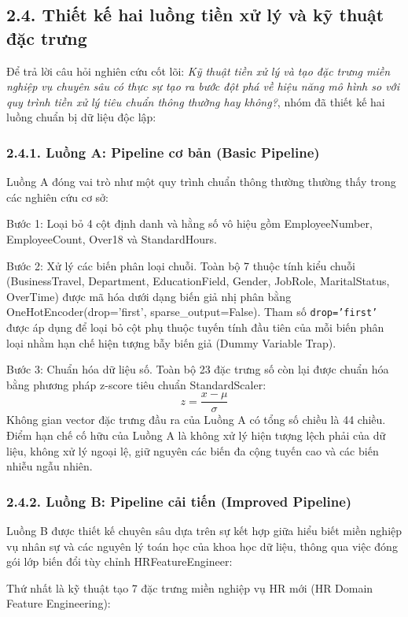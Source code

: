 \documentclass[12pt,a4paper]{article}
\begin{document}
\subsection{2.4. Thiết kế hai luồng tiền xử lý và kỹ thuật đặc trưng}
Để trả lời câu hỏi nghiên cứu cốt lõi: \textit{Kỹ thuật tiền xử lý và tạo đặc trưng miền nghiệp vụ chuyên sâu có thực sự tạo ra bước đột phá về hiệu năng mô hình so với quy trình tiền xử lý tiêu chuẩn thông thường hay không?}, nhóm đã thiết kế hai luồng chuẩn bị dữ liệu độc lập:

\subsubsection{2.4.1. Luồng A: Pipeline cơ bản (Basic Pipeline)}
Luồng A đóng vai trò như một quy trình chuẩn thông thường thường thấy trong các nghiên cứu cơ sở:

Bước 1: Loại bỏ 4 cột định danh và hằng số vô hiệu gồm EmployeeNumber, EmployeeCount, Over18 và StandardHours.

Bước 2: Xử lý các biến phân loại chuỗi. Toàn bộ 7 thuộc tính kiểu chuỗi (BusinessTravel, Department, EducationField, Gender, JobRole, MaritalStatus, OverTime) được mã hóa dưới dạng biến giả nhị phân bằng OneHotEncoder(drop='first', sparse\_output=False). Tham số \texttt{drop='first'} được áp dụng để loại bỏ cột phụ thuộc tuyến tính đầu tiên của mỗi biến phân loại nhằm hạn chế hiện tượng bẫy biến giả (Dummy Variable Trap).

Bước 3: Chuẩn hóa dữ liệu số. Toàn bộ 23 đặc trưng số còn lại được chuẩn hóa bằng phương pháp z-score tiêu chuẩn StandardScaler:
\begin{equation}
z = \frac{x - \mu}{\sigma}
\end{equation}
Không gian vector đặc trưng đầu ra của Luồng A có tổng số chiều là 44 chiều. Điểm hạn chế cố hữu của Luồng A là không xử lý hiện tượng lệch phải của dữ liệu, không xử lý ngoại lệ, giữ nguyên các biến đa cộng tuyến cao và các biến nhiễu ngẫu nhiên.

\subsubsection{2.4.2. Luồng B: Pipeline cải tiến (Improved Pipeline)}
Luồng B được thiết kế chuyên sâu dựa trên sự kết hợp giữa hiểu biết miền nghiệp vụ nhân sự và các nguyên lý toán học của khoa học dữ liệu, thông qua việc đóng gói lớp biến đổi tùy chỉnh HRFeatureEngineer:

Thứ nhất là kỹ thuật tạo 7 đặc trưng miền nghiệp vụ HR mới (HR Domain Feature Engineering):
\end{document}
